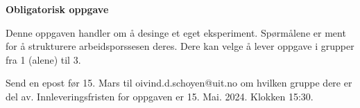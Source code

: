 \documentclass[
  12pt,
  a4paper,
  DIV=11,
  numbers=noendperiod]{scrartcl}
\renewcommand*\contentsname{Table of contents}
\newcommand\contentsname{Table of contents}
\begin{document}






\thispagestyle{plain}
\begin{center}
    \Large
    \textbf{Obligatorisk oppgave}
\end{center}


Denne oppgaven handler om å desinge et eget eksperiment. Spørmålene er ment for å strukturere arbeidsporssesen deres. Dere kan velge å lever oppgave i grupper fra 1 (alene) til 3. 



Send en epost før 15. Mars til
oivind.d.schoyen@uit.no om hvilken gruppe dere er del av.
Innleveringsfristen for oppgaven er 15. Mai. 2024. Klokken 15:30.











\newpage
\hypersetup{linkcolor=black}
\renewcommand{\contentsname}{Innholdsfortegnelse}
\renewcommand*{\figureautorefname}{Figur}
\renewcommand*{\tableautorefname}{Tabell}
\tableofcontents
\hypersetup{linkcolor=blue}
\newpage
\end{document}
